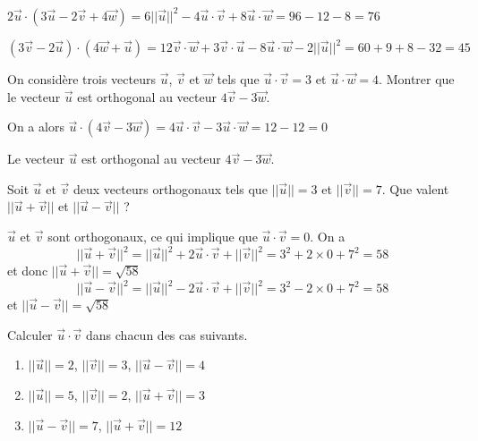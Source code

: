 \documentclass[11pt,fleqn, openany]{book} %
\begin{document}
\begin{solution} $ 2\vec u \cdot (3 \vec u - 2 \vec v + 4\vec w)=6\lvert \lvert \vec u\rvert \rvert ^2-4\vec u \cdot \vec v + 8 \vec u \cdot \vec w = 96-12-8=76$

$(3\vec v - 2 \vec u) \cdot (4\vec w + \vec u)=12\vec v \cdot \vec w + 3 \vec v \cdot \vec u -8 \vec u \cdot \vec w -2 \lvert \lvert \vec u\rvert \rvert^2=60+9+8-32=45$
\end{solution}




\begin{exercise}On considère trois vecteurs $\vec u$, $\vec v$ et $\vec w$ tels que $\vec u \cdot \vec v = 3$ et $\vec u \cdot \vec w=4$. Montrer que le vecteur $\vec u$ est orthogonal au vecteur $4\vec v - 3 \vec w$.\end{exercise}

\begin{solution}On a alors $\vec u \cdot (4\vec v - 3 \vec w)=4\vec u \cdot \vec v -3\vec u \cdot \vec w = 12-12=0$

Le vecteur $\vec u$ est orthogonal au vecteur $4\vec v - 3 \vec w$.\end{solution}




\begin{exercise}Soit $\vec u$ et $\vec v$ deux vecteurs orthogonaux tels que $\lvert\lvert\vec{u}\rvert\rvert=3$ et $\lvert\lvert\vec{v}\rvert\rvert=7$. Que valent $\lvert\lvert\vec u + \vec v\rvert\rvert$ et $\lvert\lvert\vec u -\vec v\rvert\rvert$ ?\end{exercise}

\begin{solution}$\vec u$ et $\vec v$ sont orthogonaux, ce qui implique que $\vec u \cdot \vec v = 0$. On a 
\[\lvert\lvert\vec u + \vec v\rvert\rvert^2 = \lvert\lvert\vec{u}\rvert\rvert^2 + 2 \vec u \cdot \vec v + \lvert\lvert\vec{v}\rvert\rvert^2 = 3^2+2\times 0 + 7^2 = 58\]
et donc $\lvert\lvert\vec u + \vec v\rvert\rvert=\sqrt{58}$
\[\lvert\lvert\vec u - \vec v\rvert\rvert^2 = \lvert\lvert\vec{u}\rvert\rvert^2 - 2 \vec u \cdot \vec v + \lvert\lvert\vec{v}\rvert\rvert^2 = 3^2-2\times 0 + 7^2 = 58\]
et $\lvert\lvert\vec u - \vec v\rvert\rvert=\sqrt{58}$\end{solution}




\begin{exercise}Calculer $\vec{u} \cdot \vec{v}$ dans chacun des cas suivants.
\begin{enumerate}
\item $\lvert\lvert\vec{u}\rvert\rvert=2$, $\lvert\lvert\vec{v}\rvert\rvert=3$, $\lvert\lvert\vec{u}-\vec{v}\rvert\rvert=4$
\item $\lvert\lvert\vec{u}\rvert\rvert=5$, $\lvert\lvert\vec{v}\rvert\rvert=2$, $\lvert\lvert\vec{u}+\vec{v}\rvert\rvert=3$
\item $\lvert\lvert\vec{u}-\vec{v}\rvert\rvert=7$, $\lvert\lvert\vec{u}+\vec{v}\rvert\rvert=12$
\end{enumerate}\end{exercise}
\end{document}
